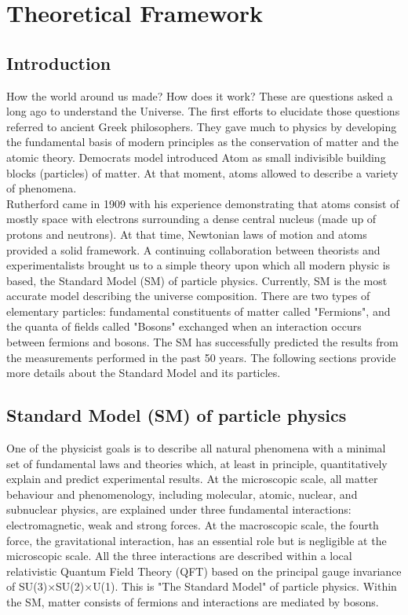\newpage
\chapter{Theoretical Framework}
\label{chap1}
\section{Introduction}
\label{chap1:intro}
How the world around us made? How does it work? These are questions asked a long ago to understand the Universe. The first efforts to elucidate those questions referred to ancient Greek philosophers. They gave much to physics by developing the fundamental basis of modern principles as the conservation of matter and the atomic theory. Democrats model introduced Atom as small indivisible building blocks (particles) of matter. At that moment, atoms allowed to describe a variety of phenomena. \\
Rutherford came in 1909 with his experience demonstrating that atoms consist of mostly space with electrons surrounding a dense central nucleus (made up of protons and neutrons). At that time, Newtonian laws of motion and atoms provided a solid framework. A continuing collaboration between theorists and experimentalists brought us to a simple theory upon which all modern physic is based, the Standard Model (SM) of particle physics. Currently, SM is the most accurate model describing the universe composition. There are two types of elementary particles: fundamental constituents of matter called "Fermions", and the quanta of fields called "Bosons" exchanged when an interaction occurs between fermions and bosons. The SM has successfully predicted the results from the measurements performed in the past 50 years. The following sections provide more details about the Standard Model and its particles.

\section{Standard Model (SM) of particle physics}
\label{chap1:SM}
One of the physicist goals is to describe all natural phenomena with a minimal set of fundamental laws and theories which, at least in principle, quantitatively explain and predict experimental results. At the microscopic scale, all matter behaviour and phenomenology, including molecular, atomic, nuclear, and subnuclear physics, are explained under three fundamental interactions: electromagnetic, weak and strong forces. At the macroscopic scale, the fourth force, the gravitational interaction, has an essential role but is negligible at the microscopic scale. All the three interactions are described within a local relativistic Quantum Field Theory (QFT) based on the principal gauge invariance of SU(3)$\times$SU(2)$\times$U(1). This is "The Standard Model" of particle physics. Within the SM, matter consists of fermions and interactions are mediated by bosons. 

